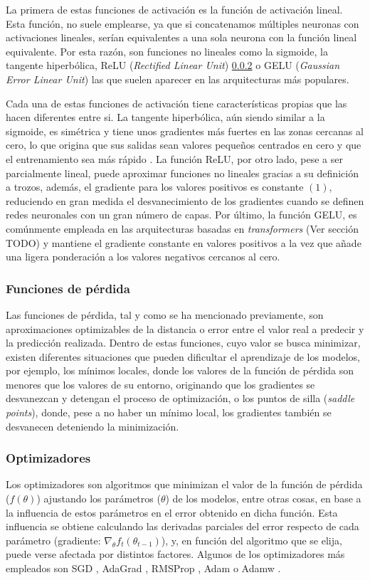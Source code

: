 La primera de estas funciones de activación es la función de activación lineal. Esta función, no suele emplearse, ya que si concatenamos múltiples neuronas con activaciones lineales, serían equivalentes a una sola neurona con la función lineal equivalente. Por esta razón, son funciones no lineales como la sigmoide, la tangente hiperbólica, ReLU (\textit{Rectified Linear Unit}) \ref{} o GELU \cite{} (\textit{Gaussian Error Linear Unit}) las que suelen aparecer en las arquitecturas más populares. 

Cada una de estas funciones de activación tiene características propias que las hacen diferentes entre si. La tangente hiperbólica, aún siendo similar a la sigmoide, es simétrica y tiene unos gradientes más fuertes en las zonas cercanas al cero, lo que origina que sus salidas sean valores pequeños centrados en cero y que el entrenamiento sea más rápido \cite{paper-lecun-efficient-backprop}. La función ReLU, por otro lado, pese a ser parcialmente lineal, puede aproximar funciones no lineales gracias a su definición a trozos, además, el gradiente para los valores positivos es constante $(1)$, reduciendo en gran medida el desvanecimiento de los gradientes cuando se definen redes neuronales con un gran número de capas. Por último, la función GELU, es comúnmente empleada en las arquitecturas basadas en \textit{transformers} (Ver sección TODO) y mantiene el gradiente constante en valores positivos a la vez que añade una ligera ponderación a los valores negativos cercanos al cero.

\subsubsection{Funciones de pérdida}
Las funciones de pérdida, tal y como se ha mencionado previamente, son aproximaciones optimizables de la distancia o error entre el valor real a predecir y la predicción realizada. Dentro de estas funciones, cuyo valor se busca minimizar, existen diferentes situaciones que pueden dificultar el aprendizaje de los modelos, por ejemplo, los mínimos locales, donde los valores de la función de pérdida son menores que los valores de su entorno, originando que los gradientes se desvanezcan y detengan el proceso de optimización, o los puntos de silla (\textit{saddle points}), donde, pese a no haber un mínimo local, los gradientes también se desvanecen deteniendo la minimización.

\subsubsection{Optimizadores}
Los optimizadores son algoritmos que minimizan el valor de la función de pérdida ($f(\theta)$) ajustando los parámetros ($\theta$) de los modelos, entre otras cosas, en base a la influencia de estos parámetros en el error obtenido en dicha función. Esta influencia se obtiene calculando las derivadas parciales del error respecto de cada parámetro (gradiente: $\nabla_{\theta} f_t(\theta_{t-1})$), y, en función del algoritmo que se elija, puede verse afectada por distintos factores. Algunos de los optimizadores más empleados son SGD \cite{}, AdaGrad \cite{}, RMSProp \cite{}, Adam \cite{} o Adamw \cite{}.

